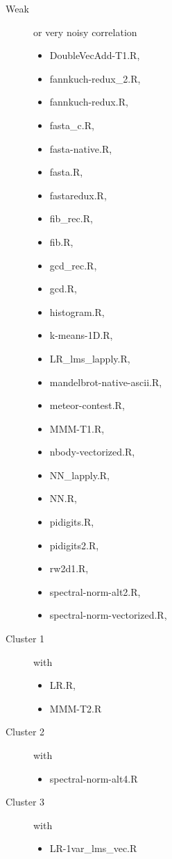 \documentclass[12pt]{article}
\begin{document}
{\begin{description}
\item[Weak] or very noisy correlation
\begin{itemize}
\item DoubleVecAdd-T1.R, 
\item fannkuch-redux\_2.R, 
\item fannkuch-redux.R, 
\item fasta\_c.R, 
\item fasta-native.R, 
\item fasta.R, 
\item fastaredux.R, 
\item fib\_rec.R, 
\item fib.R, 
\item gcd\_rec.R, 
\item gcd.R, 
\item histogram.R, 
\item k-means-1D.R, 
\item LR\_lms\_lapply.R, 
\item mandelbrot-native-ascii.R, 
\item meteor-contest.R, 
\item MMM-T1.R, 
\item nbody-vectorized.R, 
\item NN\_lapply.R, 
\item NN.R, 
\item pidigits.R, 
\item pidigits2.R, 
\item rw2d1.R, 
\item spectral-norm-alt2.R, 
\item spectral-norm-vectorized.R, 
\end{itemize}

\item[Cluster 1] with
\begin{itemize}
\item LR.R, 
\item MMM-T2.R
\end{itemize}

\item[Cluster 2] with
 \begin{itemize}
\item spectral-norm-alt4.R
 \end{itemize}

\item[Cluster 3] with
 \begin{itemize}
\item LR-1var\_lms\_vec.R
 \end{itemize}


\end{description}}
\end{document}
